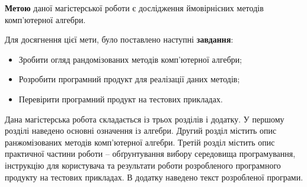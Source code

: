 \textbf{Метою} даної магістерської роботи є дослідження ймовірнісних методів комп'ютерної алгебри. 

Для досягнення цієї мети, було поставлено наступні \textbf{завдання}:
\begin{itemize}[noitemsep,partopsep=0pt,topsep=0pt,parsep=0pt]
\item Зробити огляд рандомізованих методів комп'ютерної алгебри;
\item Розробити програмний продукт для реалізації даних методів;
\item Перевірити програмний продукт на тестових прикладах.
\end{itemize}

Дана магістерська робота складається із трьох розділів і додатку. У першому розділі наведено основні означення із алгебри. Другий розділ містить опис ранжомізованих методів комп'ютерної алгебри. Третій розділ містить опис практичної частини роботи -- обґрунтування вибору середовища програмування, інструкцію для користувача та результати роботи розробленого програмного продукту на тестових прикладах. В додатку наведено текст розробленої програми.

